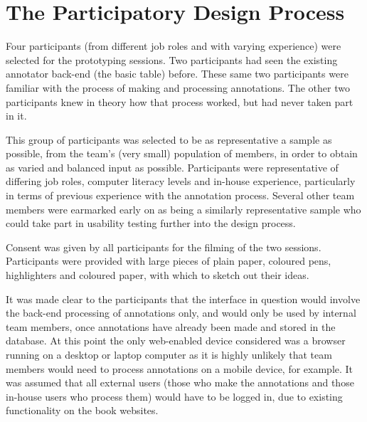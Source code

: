 
\chapter{The Participatory Design Process} %

\label{The Participatory Design Process} %





Four participants (from different job roles and with varying experience) were selected for the prototyping sessions. Two participants had seen the existing annotator back-end (the basic table) before. These same two participants were familiar with the process of making and processing annotations. The other two participants knew in theory how that process worked, but had never taken part in it. 

This group of participants was selected to be as representative a sample as possible, from the team's (very small) population of members, in order to obtain as varied and balanced input as possible. Participants were representative of differing job roles, computer literacy levels and in-house experience, particularly in terms of previous experience with the annotation process. Several other team members were earmarked early on as being a similarly representative sample who could take part in usability testing further into the design process.

Consent was given by all participants for the filming of the two sessions. Participants were provided with large pieces of plain paper, coloured pens, highlighters and coloured paper, with which to sketch out their ideas. 

It was made clear to the participants that the interface in question would involve the back-end processing of annotations only, and would only be used by internal team members, once annotations have already been made and stored in the database. At this point the only web-enabled device considered was a browser running on a desktop or laptop computer as it is highly unlikely that team members would need to process annotations on a mobile device, for example. It was assumed that all external users (those who make the annotations and those in-house users who process them) would have to be logged in, due to existing functionality on the book websites.

